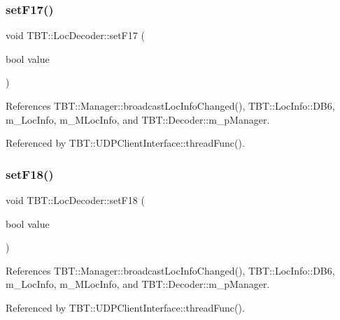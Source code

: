 \subsubsection{\texorpdfstring{set\+F17()}{setF17()}}
{\footnotesize\ttfamily void T\+B\+T\+::\+Loc\+Decoder\+::set\+F17 (\begin{DoxyParamCaption}\item[{bool}]{value }\end{DoxyParamCaption})\hspace{0.3cm}{\ttfamily [inline]}}



References T\+B\+T\+::\+Manager\+::broadcast\+Loc\+Info\+Changed(), T\+B\+T\+::\+Loc\+Info\+::\+D\+B6, m\+\_\+\+Loc\+Info, m\+\_\+\+M\+Loc\+Info, and T\+B\+T\+::\+Decoder\+::m\+\_\+p\+Manager.



Referenced by T\+B\+T\+::\+U\+D\+P\+Client\+Interface\+::thread\+Func().

\mbox{\label{classTBT_1_1LocDecoder_aae4349cafcf17f8530ce151507bf3cf3_aae4349cafcf17f8530ce151507bf3cf3}} 
\subsubsection{\texorpdfstring{set\+F18()}{setF18()}}
{\footnotesize\ttfamily void T\+B\+T\+::\+Loc\+Decoder\+::set\+F18 (\begin{DoxyParamCaption}\item[{bool}]{value }\end{DoxyParamCaption})\hspace{0.3cm}{\ttfamily [inline]}}



References T\+B\+T\+::\+Manager\+::broadcast\+Loc\+Info\+Changed(), T\+B\+T\+::\+Loc\+Info\+::\+D\+B6, m\+\_\+\+Loc\+Info, m\+\_\+\+M\+Loc\+Info, and T\+B\+T\+::\+Decoder\+::m\+\_\+p\+Manager.



Referenced by T\+B\+T\+::\+U\+D\+P\+Client\+Interface\+::thread\+Func().

\mbox{\label{classTBT_1_1LocDecoder_a4625176dfddd8495f7a11be4b9dd29bf_a4625176dfddd8495f7a11be4b9dd29bf}} 

